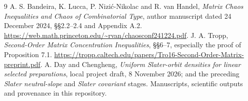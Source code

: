 \documentclass[11pt]{article}
\begin{document}
\begin{thebibliography}{9}
 A. S. Bandeira, K. Lucca, P. Nizi\'c-Nikolac and
R. van Handel, \emph{Matrix Chaos Inequalities and Chaos of
Combinatorial Type}, author manuscript dated 24 December 2024,
\S\S2.2--2.4 and Appendix A.2.
\url{https://web.math.princeton.edu/~rvan/chaosconf241224.pdf}.
 J. A. Tropp,
\emph{Second-Order Matrix Concentration Inequalities},
\S\S6--7, especially the proof of Proposition 7.1.
\url{https://tropp.caltech.edu/papers/Tro16-Second-Order-Matrix-preprint.pdf}.
 A. Day and Chengheng,
\emph{Uniform Slater-orbit densities for linear selected preparations},
local project draft, 8 November 2026; and the preceding
\emph{Slater neutral-slope} and \emph{Slater covariant} stages.
Manuscripts, scientific outputs and provenance in this repository.
\end{thebibliography}
\end{document}
